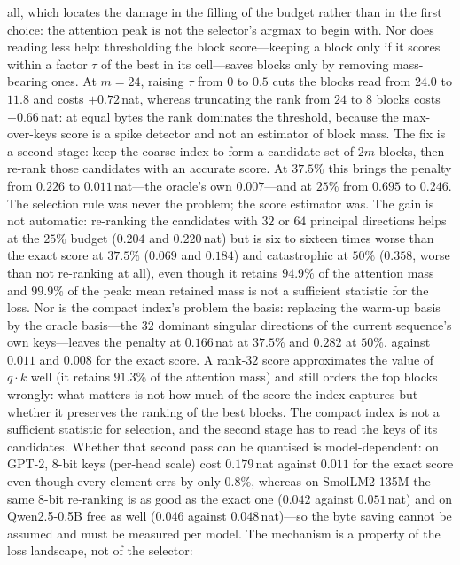 \documentclass[sigconf,nonacm,11pt]{acmart}
\begin{document}
all, which locates the damage in the filling of the budget rather than in the
first choice: the attention peak is not the selector's argmax to begin with. Nor does reading less help: thresholding the block score---keeping a block only
if it scores within a factor $\tau$ of the best in its cell---saves blocks only by
removing mass-bearing ones. At $m=24$, raising $\tau$ from $0$ to $0.5$ cuts the
blocks read from $24.0$ to $11.8$ and costs $+0.72$\,nat, whereas truncating the
rank from $24$ to $8$ blocks costs $+0.66$\,nat: at equal bytes the rank dominates
the threshold, because the max-over-keys score is a spike detector and not an
estimator of block mass. The fix is a second stage: keep the coarse index to form a candidate set of $2m$
blocks, then re-rank those candidates with an accurate score. At $37.5\%$ this
brings the penalty from $0.226$ to $0.011$\,nat---the oracle's own $0.007$---and at
$25\%$ from $0.695$ to $0.246$. The selection rule was never the problem; the score
estimator was. The gain is not automatic: re-ranking the candidates with $32$ or
$64$ principal directions helps at the $25\%$ budget ($0.204$ and $0.220$\,nat) but
is six to sixteen times worse than the exact score at $37.5\%$ ($0.069$ and
$0.184$) and catastrophic at $50\%$ ($0.358$, worse than not re-ranking at all),
even though it retains $94.9\%$ of the attention mass and $99.9\%$ of the peak:
mean retained mass is not a sufficient statistic for the loss. Nor is the compact index's problem the basis: replacing the warm-up basis by
the oracle basis---the $32$ dominant singular directions of the current
sequence's own keys---leaves the penalty at $0.166$\,nat at $37.5\%$ and $0.282$
at $50\%$, against $0.011$ and $0.008$ for the exact score. A rank-$32$ score
approximates the value of $q\cdot k$ well (it retains $91.3\%$ of the attention
mass) and still orders the top blocks wrongly: what matters is not how much of
the score the index captures but whether it preserves the ranking of the best
blocks. The compact index is not a sufficient statistic for selection, and the
second stage has to read the keys of its candidates. Whether that second pass can be quantised is model-dependent: on GPT-2, $8$-bit
keys (per-head scale) cost $0.179$\,nat against $0.011$ for the exact score even
though every element errs by only $0.8\%$, whereas on SmolLM2-135M the same
$8$-bit re-ranking is as good as the exact one ($0.042$ against $0.051$\,nat) and on Qwen2.5-0.5B free as well
($0.046$ against $0.048$\,nat)---so
the byte saving cannot be assumed and must be measured per model. The mechanism is a property of the loss landscape, not of the selector:
\end{document}
